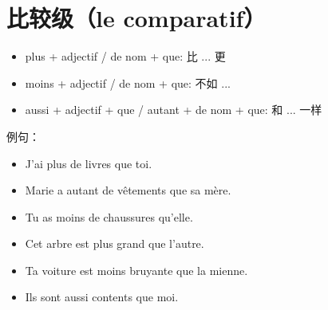 
\chapter{比较级（le comparatif）}
\label{cha:le-comparatif}


\begin{itemize}
\item plus + adjectif / de nom + que: 比 ... 更
\item moins + adjectif / de nom + que: 不如 ...
\item aussi + adjectif + que / autant + de nom + que: 和 ... 一样
\end{itemize}


例句：
\begin{itemize}
\item J'ai plus de livres que toi.
\item Marie a autant de vêtements que sa mère.
\item Tu as moins de chaussures qu'elle.
\item Cet arbre est plus grand que l’autre.
\item Ta voiture est moins bruyante que la mienne.	
\item Ils sont aussi contents que moi.
\end{itemize}

